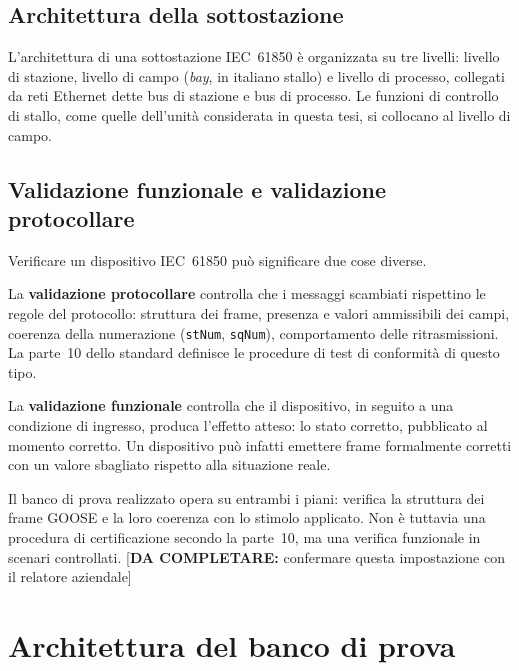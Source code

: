 \documentclass[11pt,a4paper,italian,oneside,openany]{book}
\newcommand{\daf}[1]{{\color{red}[\textbf{DA COMPLETARE:} #1]}}
\begin{document}
\section{Architettura della sottostazione}
L'architettura di una sottostazione IEC~61850 è organizzata su tre livelli: livello di stazione, livello di campo (\textit{bay}, in italiano stallo) e livello di processo, collegati da reti Ethernet dette bus di stazione e bus di processo. Le funzioni di controllo di stallo, come quelle dell'unità considerata in questa tesi, si collocano al livello di campo.

\section{Validazione funzionale e validazione protocollare}
Verificare un dispositivo IEC~61850 può significare due cose diverse.

La \textbf{validazione protocollare} controlla che i messaggi scambiati rispettino le regole del protocollo: struttura dei frame, presenza e valori ammissibili dei campi, coerenza della numerazione (\texttt{stNum}, \texttt{sqNum}), comportamento delle ritrasmissioni. La parte~10 dello standard definisce le procedure di test di conformità di questo tipo.

La \textbf{validazione funzionale} controlla che il dispositivo, in seguito a una condizione di ingresso, produca l'effetto atteso: lo stato corretto, pubblicato al momento corretto. Un dispositivo può infatti emettere frame formalmente corretti con un valore sbagliato rispetto alla situazione reale.

Il banco di prova realizzato opera su entrambi i piani: verifica la struttura dei frame GOOSE e la loro coerenza con lo stimolo applicato. Non è tuttavia una procedura di certificazione secondo la parte~10, ma una verifica funzionale in scenari controllati. \daf{confermare questa impostazione con il relatore aziendale}

\chapter{Architettura del banco di prova}\label{cap:banco}
\end{document}
